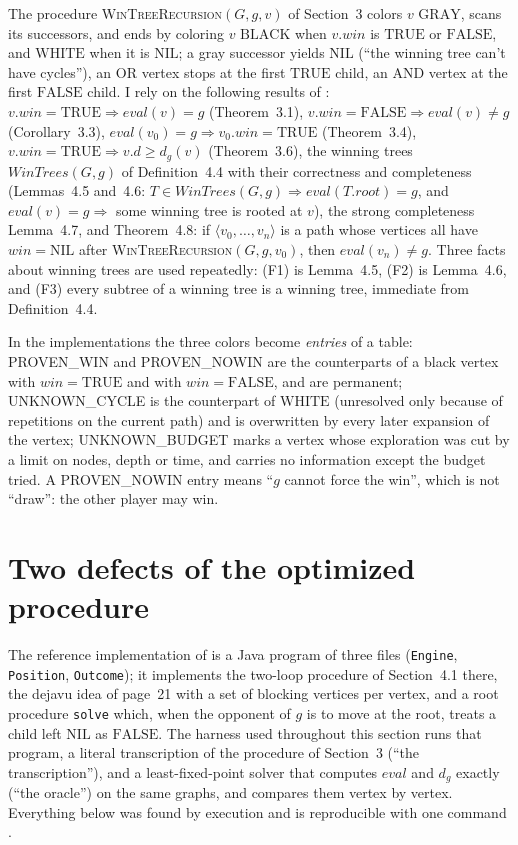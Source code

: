 \documentclass{article}
\theoremstyle{plain}
\theoremstyle{definition}
\theoremstyle{remark}
\newcommand{\eval}{\mathit{eval}}
\newcommand{\win}{\mathit{win}}
\newcommand{\WinTrees}{\mathit{WinTrees}}
\newcommand{\TRUE}{\ensuremath{\mathrm{TRUE}}}
\newcommand{\FALSE}{\ensuremath{\mathrm{FALSE}}}
\newcommand{\NIL}{\ensuremath{\mathrm{NIL}}}
\newcommand{\GRAY}{\ensuremath{\mathrm{GRAY}}}
\newcommand{\WHITE}{\ensuremath{\mathrm{WHITE}}}
\newcommand{\BLACK}{\ensuremath{\mathrm{BLACK}}}
\newcommand{\PW}{\textsf{PROVEN\_WIN}}
\newcommand{\PN}{\textsf{PROVEN\_NOWIN}}
\newcommand{\UC}{\textsf{UNKNOWN\_CYCLE}}
\newcommand{\UB}{\textsf{UNKNOWN\_BUDGET}}
\newcommand{\code}[1]{\texttt{#1}}
\newcommand{\WTR}{\textsc{WinTreeRecursion}}
\begin{document}
The procedure \WTR{}$(G, g, v)$ of Section~3 colors $v$ \GRAY{}, scans its successors, and ends by coloring $v$ \BLACK{} when $v.\win$ is \TRUE{} or \FALSE{}, and \WHITE{} when it is \NIL{}; a gray successor yields \NIL{} (``the winning tree can't have cycles''), an OR vertex stops at the first \TRUE{} child, an AND vertex at the first \FALSE{} child. I rely on the following results of \cite{romano2026}: $v.\win = \TRUE \Rightarrow \eval(v) = g$ (Theorem~3.1), $v.\win = \FALSE \Rightarrow \eval(v) \neq g$ (Corollary~3.3), $\eval(v_0) = g \Rightarrow v_0.\win = \TRUE$ (Theorem~3.4), $v.\win = \TRUE \Rightarrow v.d \geq d_g(v)$ (Theorem~3.6), the winning trees $\WinTrees(G, g)$ of Definition~4.4 with their correctness and completeness (Lemmas~4.5 and~4.6: $T \in \WinTrees(G,g) \Rightarrow \eval(T.\mathit{root}) = g$, and $\eval(v) = g \Rightarrow$ some winning tree is rooted at $v$), the strong completeness Lemma~4.7, and Theorem~4.8: if $\langle v_0, \dots, v_n\rangle$ is a path whose vertices all have $\win = \NIL$ after \WTR{}$(G, g, v_0)$, then $\eval(v_n) \neq g$. Three facts about winning trees are used repeatedly: (F1) is Lemma~4.5, (F2) is Lemma~4.6, and (F3) every subtree of a winning tree is a winning tree, immediate from Definition~4.4.

{\sloppy In the implementations the three colors become \emph{entries} of a table: \PW{} and \PN{} are the counterparts of a black vertex with $\win = \TRUE$ and with $\win = \FALSE$, and are permanent; \UC{} is the counterpart of \WHITE{} (unresolved only because of repetitions on the current path) and is overwritten by every later expansion of the vertex; \UB{} marks a vertex whose exploration was cut by a limit on nodes, depth or time, and carries no information except the budget tried. A \PN{} entry means ``$g$ cannot force the win'', which is not ``draw'': the other player may win.\par}

\section{Two defects of the optimized procedure}\label{sec:defects}

The reference implementation of \cite{romano2026} is a Java program of three files (\code{Engine}, \code{Position}, \code{Outcome}); it implements the two-loop procedure of Section~4.1 there, the dejavu idea of page~21 with a set of blocking vertices per vertex, and a root procedure \code{solve} which, when the opponent of $g$ is to move at the root, treats a child left \NIL{} as \FALSE{}. The harness used throughout this section runs that program, a literal transcription of the procedure of Section~3 (``the transcription''), and a least-fixed-point solver that computes $\eval$ and $d_g$ exactly (``the oracle'') on the same graphs, and compares them vertex by vertex. Everything below was found by execution and is reproducible with one command \cite{wintreechess}.
\end{document}
